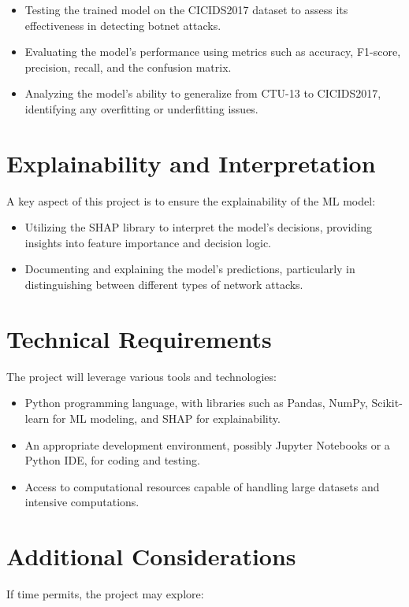 \begin{itemize}
    \item Testing the trained model on the CICIDS2017 dataset to assess its effectiveness in detecting botnet attacks.
    \item Evaluating the model's performance using metrics such as accuracy, F1-score, precision, recall, and the confusion matrix.
    \item Analyzing the model's ability to generalize from CTU-13 to CICIDS2017, identifying any overfitting or underfitting issues.
\end{itemize}

\section{Explainability and Interpretation}
A key aspect of this project is to ensure the explainability of the ML model:

\begin{itemize}
    \item Utilizing the SHAP library to interpret the model's decisions, providing insights into feature importance and decision logic.
    \item Documenting and explaining the model's predictions, particularly in distinguishing between different types of network attacks.
\end{itemize}

\section{Technical Requirements}
The project will leverage various tools and technologies:

\begin{itemize}
    \item Python programming language, with libraries such as Pandas, NumPy, Scikit-learn for ML modeling, and SHAP for explainability.
    \item An appropriate development environment, possibly Jupyter Notebooks or a Python IDE, for coding and testing.
    \item Access to computational resources capable of handling large datasets and intensive computations.
\end{itemize}

\section{Additional Considerations}
If time permits, the project may explore:

